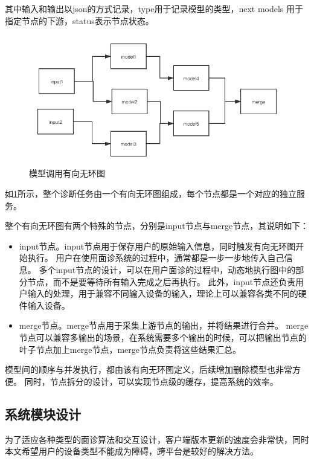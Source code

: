 其中输入和输出以json的方式记录，type用于记录模型的类型，next models 用于指定节点的下游，status表示节点状态。

\begin{figure}
    \centering
    \includegraphics[width=15cm]{images/model_dag.png}
    \caption{模型调用有向无环图}
    \label{fig:model_dag}
\end{figure}

如\ref{fig:model_dag}所示，整个诊断任务由一个有向无环图组成，每个节点都是一个对应的独立服务。

整个有向无环图有两个特殊的节点，分别是input节点与merge节点，其说明如下：
\begin{itemize}
    \item input节点。input节点用于保存用户的原始输入信息，同时触发有向无环图开始执行。
    用户在使用面诊系统的过程中，通常都是一步一步地传入自己信息。
    多个input节点的设计，可以在用户面诊的过程中，动态地执行图中的部分节点，而不是要等待所有输入完成之后再执行。
    此外，input节点还负责用户输入的处理，用于兼容不同输入设备的输入，理论上可以兼容各类不同的硬件输入设备。

    \item merge节点。merge节点用于采集上游节点的输出，并将结果进行合并。
    merge节点可以兼容多输出的场景，在系统需要多个输出的时候，可以把输出节点的叶子节点加上merge节点，merge节点负责将这些结果汇总。
\end{itemize}


模型间的顺序与并发执行，都由该有向无环图定义，后续增加删除模型也非常方便。
同时，节点拆分的设计，可以实现节点级的缓存，提高系统的效率。


\subsection{系统模块设计}
为了适应各种类型的面诊算法和交互设计，客户端版本更新的速度会非常快，同时本文希望用户的设备类型不能成为障碍，跨平台是较好的解决方法。



